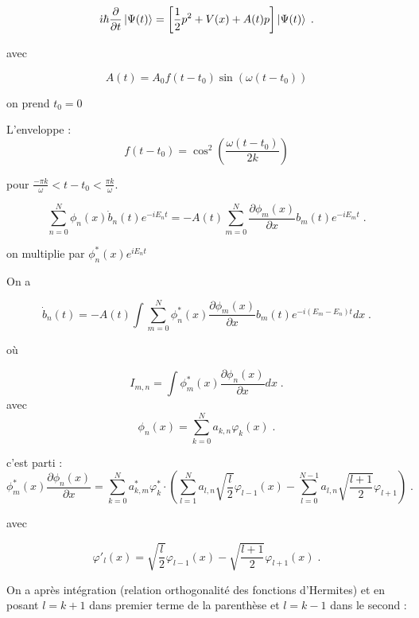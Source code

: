 \documentclass{report}
\begin{document}
$$\dot{\imath}\hbar\frac{\partial}{\partial t}\ket{\Psi(t)}=\left[\frac{1}{2}p^2+ V(x)+A(t)p\right]\ket{\Psi(t)}\;.$$

avec

\begin{equation}
A(t)= A_{0}f(t-t_{0})\sin(\omega (t-t_{0}))
\end{equation}

on prend $t_{0}=0$

L'enveloppe :
$$f(t-t_{0})=\cos^{2} \left(\frac{\omega (t-t_{0})}{2k}\right)$$

pour $\frac{-\pi k}{\omega}<t-t_{0}<\frac{\pi k}{\omega}$.



\begin{equation}
\sum_{n=0}^{N}\phi_{n}(x)\dot{b}_{n}(t) e^{-iE_{n}t} = - A(t) \sum_{m=0}^{N}\frac{\partial \phi_{m}(x)}{\partial x}b_{m}(t) e^{-iE_{m}t}\;.
\end{equation}

on multiplie par $\phi_{n}^{\ast}(x) e^{iE_{n}t}$

On a 

\begin{equation}
\dot{b}_{n}(t) = - A(t) \int \sum_{m=0}^{N}\phi_{n}^{\ast}(x)\frac{\partial \phi_{m}(x)}{\partial x}b_{m}(t) e^{-i(E_{m}-E_{n})t} dx\;.
\end{equation}

où

\begin{equation}
I_{m,n}= \int \phi_{m}^{\ast}(x)\frac{\partial \phi_{n}(x)}{\partial x} dx\;.
\end{equation}
avec
\begin{equation}
\phi_{n}(x) = \sum_{k=0}^{N} a_{k,n}\varphi_{k}(x)\;.
\end{equation}

c'est parti :
\begin{equation}
\phi_{m}^{\ast}(x)\frac{\partial \phi_{n}(x)}{\partial x} = \sum_{k=0}^{N} a_{k,m}^{\ast}\varphi_{k}^{\ast} \cdot \left(\sum_{l=1}^{N}a_{l,n} \sqrt{\frac{l}{2}}\varphi_{l-1}(x)-\sum_{l=0}^{N-1}a_{l,n}\sqrt{\frac{l+1}{2}}\varphi_{l+1} \right)\;.
\end{equation}

avec 

\begin{equation}
\varphi'_{l}(x) =  \sqrt{\frac{l}{2}} \varphi_{l-1}(x)-\sqrt{\frac{l+1}{2}}\varphi_{l+1}(x)\;.
\end{equation}

On a après intégration (relation orthogonalité des fonctions d'Hermites) et en posant $l =k+1$ dans premier terme de la parenthèse et $l =k-1$ dans le second :
\end{document}
